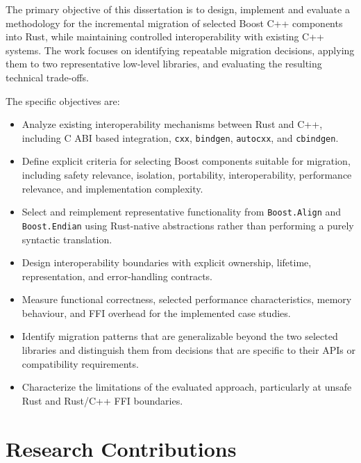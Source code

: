 The primary objective of this dissertation is to design, implement and evaluate a methodology for the incremental migration of selected Boost C++ components into Rust, while maintaining controlled interoperability with existing C++ systems. The work focuses on identifying repeatable migration decisions, applying them to two representative low-level libraries, and evaluating the resulting technical trade-offs.

The specific objectives are:
\begin{itemize}
    \item Analyze existing interoperability mechanisms between Rust and C++, including C ABI based integration, \texttt{cxx}, \texttt{bindgen}, \texttt{autocxx}, and \texttt{cbindgen}.
    \item Define explicit criteria for selecting Boost components suitable for migration, including safety relevance, isolation, portability, interoperability, performance relevance, and implementation complexity.
    \item Select and reimplement representative functionality from \texttt{Boost.Align} and \texttt{Boost.Endian} using Rust-native abstractions rather than performing a purely syntactic translation.
    \item Design interoperability boundaries with explicit ownership, lifetime, representation, and error-handling contracts.
    \item Measure functional correctness, selected performance characteristics, memory behaviour, and FFI overhead for the implemented case studies.
    \item Identify migration patterns that are generalizable beyond the two selected libraries and distinguish them from decisions that are specific to their APIs or compatibility requirements.
    \item Characterize the limitations of the evaluated approach, particularly at unsafe Rust and Rust/C++ FFI boundaries.
\end{itemize}

\section{Research Contributions}
\label{sec:research_contributions}

